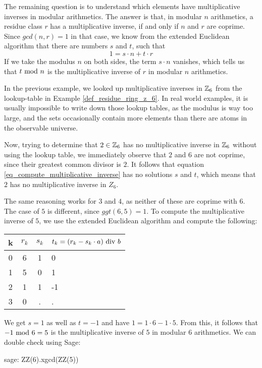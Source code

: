 The remaining question is to understand which elements have multiplicative inverses in modular arithmetics. The answer is that, in modular $n$ arithmetics, a residue class $r$ has a multiplicative inverse, if and only if $n$ and $r$ are coprime. Since $gcd(n,r)=1$ in that case, we know from the extended Euclidean algorithm that there are numbers $s$ and $t$, such that 
\begin{equation}
\label{eq_compute_multiplicative_inverse}
1 = s\cdot n + t\cdot r
\end{equation}
If we take the modulus $n$ on both sides, the term $s\cdot n$ vanishes, which tells us that $t \text{ mod } n$ is the multiplicative inverse of $r$ in modular $n$ arithmetics.
\begin{example} In the previous example, we looked up multiplicative inverses in $\mathbb{Z}_6$ from the lookup-table in Example \ref{def_residue_ring_z_6}. In real world examples, it is  usually impossible to write down those lookup tables, as the modulus is way too large, and the sets occasionally contain more elements than there are atoms in the observable universe.

Now, trying to determine that $2\in \mathbb{Z}_6$ has no multiplicative inverse in $\mathbb{Z}_6$ without using the lookup table, we immediately observe that $2$ and $6$ are not coprime, since their greatest common divisor is $2$. It follows that equation \ref{eq_compute_multiplicative_inverse} has no solutions $s$ and $t$, which means that $2$ has no multiplicative inverse in $Z_6$.

The same reasoning works for $3$ and $4$, as neither of these are coprime with $6$. The case of  $5$ is different, since $ggt(6,5)=1$. To compute the multiplicative inverse of $5$, we use the extended Euclidean algorithm and compute  the following:
\begin{center}
  \begin{tabular}{c | c c l}
    k & $ r_k $ & $ s_k $ & $ t_k = (r_k-s_k \cdot a) \text{ div } b $ \\\hline
    0 & 6 & 1 & 0 \\
    1 & 5 & 0 & 1 \\
    2 & 1 & 1 & -1 \\
    3 & 0 & . & . \\
  \end{tabular}
\end{center}

We get $s=1$ as well as $t=-1$ and have $1 = 1\cdot 6 -1\cdot 5$. From this, it follows that $-1 \text{ mod } 6=5$ is the multiplicative inverse of $5$ in modular $6$ arithmetics. We can double check using Sage:
\begin{sagecommandline}
sage: ZZ(6).xgcd(ZZ(5))
\end{sagecommandline}
\end{example}
